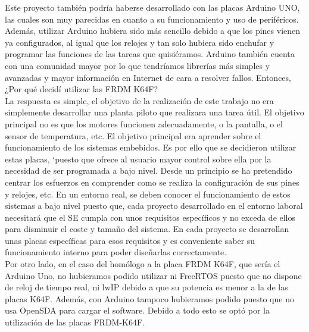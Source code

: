 Este proyecto también podría haberse desarrollado con las placas Arduino UNO, las cuales son muy parecidas en cuanto a su funcionamiento y uso de periféricos. Además, utilizar Arduino hubiera sido más sencillo debido a que los pines vienen ya configurados, al igual que los relojes y tan solo hubiera sido enchufar y programar las funciones de las tareas que quisiéramos. Arduino también cuenta con una comunidad mayor por lo que tendríamos librerías más simples y avanzadas y mayor información en Internet de cara a resolver fallos. Entonces, ¿Por qué decidí utilizar las FRDM K64F?\\
La respuesta es simple, el objetivo de la realización de este trabajo no era simplemente desarrollar una planta piloto que realizara una tarea útil. El objetivo principal no es que los motores funcionen adecuadamente, o la pantalla, o el sensor de temperatura, etc. El objetivo principal era aprender sobre el funcionamiento de los sistemas embebidos. Es por ello que se decidieron utilizar estas placas, `puesto que ofrece al usuario mayor control sobre ella por la necesidad de ser programada a bajo nivel.
Desde un principio se ha pretendido centrar los esfuerzos en comprender como se realiza la configuración de sus pines y relojes, etc. En un entorno real, se deben conocer el funcionamiento de estos sistemas a bajo nivel puesto que, cada proyecto desarrollado en el entorno laboral necesitará que el SE cumpla con unos requisitos específicos y no exceda de ellos para disminuir el coste y tamaño del sistema. En cada proyecto se desarrollan unas placas específicas para esos requisitos y es conveniente saber su funcionamiento interno para poder diseñarlas correctamente.\\
Por otro lado, en el caso del homólogo a la placa FRDM K64F, que sería el Arduino Uno, no hubieramos podido utilizar ni FreeRTOS puesto que no dispone de reloj de tiempo real, ni lwIP debido a que su potencia es menor a la de las placas K64F. Además, con Arduino tampoco hubieramos podido  puesto que no usa OpenSDA para cargar el software. 
Debido a todo esto se optó por la utilización de las placas FRDM-K64F.


